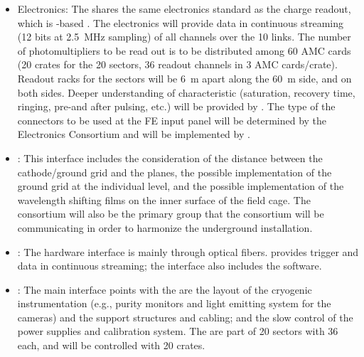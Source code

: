 
\begin{itemize}

\item {} Electronics: The  shares the same  electronics standard as the charge readout, which is -based \cite{utca}. The  electronics will provide data in continuous streaming (\num{12} bits at \SI{2.5}{\MHz} sampling) of all  channels over the \SI{10}{\Gbps} links. The number of photomultipliers to be read out is \dpnumpmtch to be distributed among \num{60} AMC cards (\num{20}  crates for the \num{20}  sectors, \num{36} readout channels in \num{3} AMC cards/crate). Readout racks for the sectors will be \SI{6}{\m} apart along the \SI{60}{\m} side, and on both sides. Deeper understanding of  characteristic (saturation, recovery time, ringing, pre-and after pulsing, etc.) will be provided by  . The type of the connectors to be used at the FE input panel will be determined by the  Electronics Consortium and will be implemented by  .

\item {}: This interface includes the consideration of the distance between the cathode/ground grid and the  planes, the possible implementation of the ground grid at the individual  level, and the possible implementation of the wavelength shifting films on the inner surface of the field cage. The  consortium will also be the primary group that the  consortium will be communicating in order to harmonize the underground installation.

\item {}: The hardware interface is mainly through optical fibers.   provides trigger and data in continuous streaming;  the interface also includes the  software.

\item {}: The main interface points with the  are the layout of the cryogenic instrumentation (e.g., purity monitors and light emitting system for the cameras) and the  support structures and cabling; and the slow control of the  power supplies and calibration system. The   are part of \num{20} sectors with \num{36}  each, and will be controlled with \num{20}  crates.


\end{itemize}
